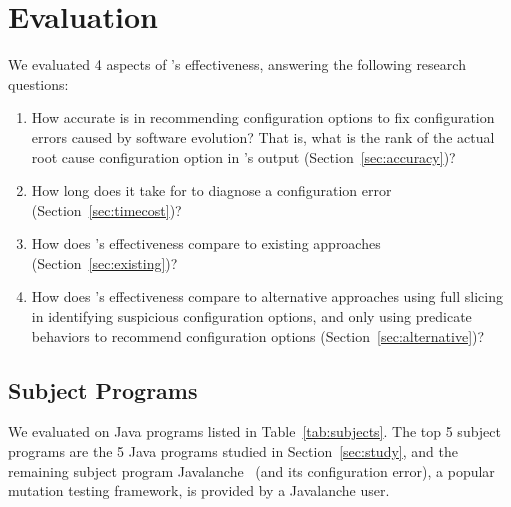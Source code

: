 
\section{Evaluation}
\label{sec:evaluation}

We evaluated 4 aspects of \ourtool's effectiveness, answering
the following research questions:

\begin{enumerate}
\item How accurate is \ourtool in recommending configuration options
to fix configuration errors caused by software evolution? That is, what is the rank of the
actual root cause configuration option in \ourtool's output (Section~\ref{sec:accuracy})?

\item How long does it take for \ourtool to diagnose
a configuration error (Section~\ref{sec:timecost})?

\item How does \ourtool's effectiveness compare to
existing approaches (Section~\ref{sec:existing})?

\item How does \ourtool's effectiveness compare to
alternative approaches using full slicing in identifying
suspicious configuration options, and only using predicate behaviors
to recommend configuration options (Section~\ref{sec:alternative})?

\end{enumerate}

\subsection{Subject Programs}

We evaluated \ourtool on \subjnum Java programs
listed in Table~\ref{tab:subjects}.
The top 5 subject programs are the 5 Java programs
studied in Section~\ref{sec:study},
and the remaining subject program Javalanche~\cite{javalanche}
(and its configuration error), a popular mutation
testing framework, is provided by a Javalanche user.

\newcommand{\randoopoptnum}{57\xspace}
\newcommand{\wekaoptnum}{14\xspace}
\newcommand{\synopticoptnum}{37\xspace}
\newcommand{\jchordoptnum}{79\xspace}
\newcommand{\jmeteroptnum}{55\xspace}
\newcommand{\javalancheoptnum}{27\xspace}

